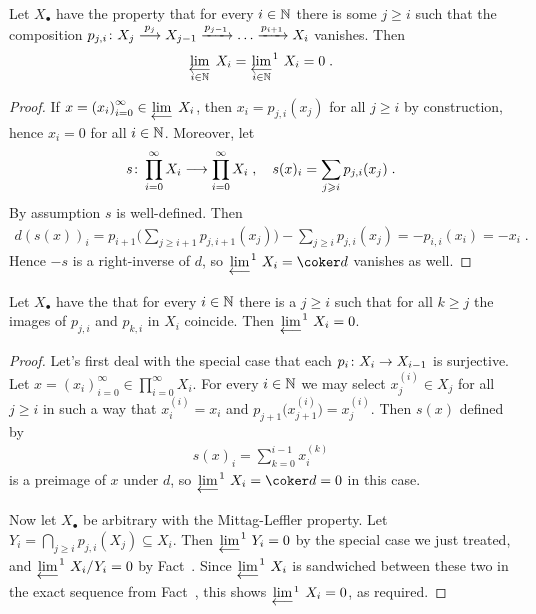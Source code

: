 \documentclass[a4paper,parskip=half,numbers=enddot, DIV=12]{scrreprt}
\renewcommand{\geq}{\geqslant}
\begin{document}
\begin{fact}
	Let $X_\bullet$ have the property that for every $i\in\mathbb{N}$ there is some $j\geq i$ such that the composition $p_{j,i}\colon X_j\morphism[p_j]X_{j-1}\xrightarrow{p_{j-1}}\ldots\xrightarrow{p_{i+1}}X_i$ vanishes. Then
	\begin{align*}
		\limit[i\in\IN]X_i=\limit[i\in\IN][^1]X_i=0\;.
	\end{align*}
\end{fact}
\begin{proof}
	If $x=\left(x_i\right)_{i=0}^\infty\in\limit X_i$, then $x_i=p_{j,i}(x_j)$ for all $j\geq i$ by construction, hence $x_i=0$ for all $i\in\mathbb{N}$. Moreover, let
	\begin{align*}
		s\colon \prod_{i=0}^{\infty}X_i\morphism\prod_{i=0}^\infty X_i\;,\quad s(x)_i=\sum_{j\geq i}p_{j,i}(x_j)\;.
	\end{align*}
	By assumption $s$ is well-defined. Then
	\begin{align*}
		d(s(x))_i=p_{i+1}\bigg(\sum_{j\geq i+1}p_{j,i+1}(x_j)\bigg)-\sum_{j\geq i}p_{j,i}(x_j)=-p_{i,i}(x_i)=-x_i\;.
	\end{align*}
	Hence $-s$ is a right-inverse of $d$, so $\limit[][^1]X_i=\coker d$ vanishes as well.
\end{proof}
\begin{fact}
	Let $X_\bullet$ have the  that for every $i\in\mathbb{N}$ there is a $j\geq i$ such that for all $k\geq j$ the images of $p_{j,i}$ and $p_{k,i}$ in $X_i$ coincide. Then $\limit[][^1]X_i=0$.
\end{fact}
\begin{proof}
	Let's first deal with the special case that each $p_i\colon X_i\morphism X_{i-1}$ is surjective. Let $x=\left(x_i\right)_{i=0}^\infty\in\prod_{i=0}^\infty X_i$. For every $i\in\mathbb{N}$ we may select $x_j^{(i)}\in X_j$ for all $j\geq i$ in such a way that $x_i^{(i)}=x_i$ and $p_{j+1}\big(x_{j+1}^{(i)}\big)=x_j^{(i)}$. Then $s(x)$ defined by
	\begin{align*}
		s(x)_i=\sum_{k=0}^{i-1}x_i^{(k)}
	\end{align*}
	is a preimage of $x$ under $d$, so $\limit[][^1]X_i=\coker d=0$ in this case.
	
	Now let $X_\bullet$ be arbitrary with the Mittag-Leffler property. Let $Y_i=\bigcap_{j\geq i}p_{j,i}(X_j)\subseteq X_i$. Then $\limit[][^1]Y_i=0$ by the special case we just treated, and $\limit[][^1]X_i/Y_i=0$ by Fact~. Since $\limit[][^1]X_i$ is sandwiched between these two in the exact sequence from Fact~, this shows $\limit[][\smash{^1}]X_i=0$, as required.
\end{proof}
\end{document}
